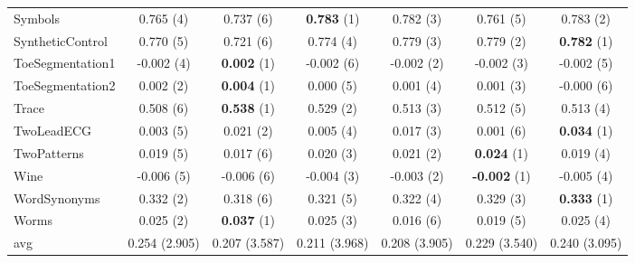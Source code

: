 \begin{table}[ht]
\begin{adjustbox}{width=\textwidth}
\begin{tabular}{lcccccc}
    Symbols & 0.765 (4) & 0.737 (6) & \textbf{0.783} (1) & 0.782 (3) & 0.761 (5) & 0.783 (2) \\
    SyntheticControl & 0.770 (5) & 0.721 (6) & 0.774 (4) & 0.779 (3) & 0.779 (2) & \textbf{0.782} (1) \\
    ToeSegmentation1 & -0.002 (4) & \textbf{0.002} (1) & -0.002 (6) & -0.002 (2) & -0.002 (3) & -0.002 (5) \\
    ToeSegmentation2 & 0.002 (2) & \textbf{0.004} (1) & 0.000 (5) & 0.001 (4) & 0.001 (3) & -0.000 (6) \\
    Trace & 0.508 (6) & \textbf{0.538} (1) & 0.529 (2) & 0.513 (3) & 0.512 (5) & 0.513 (4) \\
    TwoLeadECG & 0.003 (5) & 0.021 (2) & 0.005 (4) & 0.017 (3) & 0.001 (6) & \textbf{0.034} (1) \\
    TwoPatterns & 0.019 (5) & 0.017 (6) & 0.020 (3) & 0.021 (2) & \textbf{0.024} (1) & 0.019 (4) \\
    Wine & -0.006 (5) & -0.006 (6) & -0.004 (3) & -0.003 (2) & \textbf{-0.002} (1) & -0.005 (4) \\
    WordSynonyms & 0.332 (2) & 0.318 (6) & 0.321 (5) & 0.322 (4) & 0.329 (3) & \textbf{0.333} (1) \\
    Worms & 0.025 (2) & \textbf{0.037} (1) & 0.025 (3) & 0.016 (6) & 0.019 (5) & 0.025 (4) \\
    \hline 
    avg & 0.254 (2.905) & 0.207 (3.587) & 0.211 (3.968) & 0.208 (3.905) & 0.229 (3.540) & 0.240 (3.095) \\ 
    \hline
    \end{tabular}
    \end{adjustbox}
    \end{table}
    
    
    
